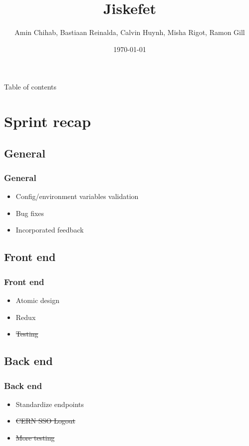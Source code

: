 \documentclass[12pt]{beamer}
\title{Jiskefet}
\author{Amin Chihab, Bastiaan Reinalda, Calvin Huynh, Misha Rigot, Ramon Gill}
\date{\today}
\begin{document}
	\begin{frame}
	\titlepage
	\end{frame}

	\begin{frame}{Table of contents}
		\tableofcontents
    \end{frame}

    \section{Sprint recap}
    \subsection{General}
    \begin{frame}
        \frametitle{General}
        \begin{itemize}
            \item Config/environment variables validation
            \item Bug fixes
            \item Incorporated feedback
        \end{itemize}
    \end{frame}

    \subsection{Front end}
	\begin{frame}
		\frametitle{Front end}
		\begin{itemize}
			\item Atomic design
			\item Redux
			\item \sout{Testing}                                       
		\end{itemize}
	\end{frame}

    \subsection{Back end}
	\begin{frame}
		\frametitle{Back end}
		\begin{itemize}
			\item Standardize endpoints
			\item \sout{CERN SSO Logout}
			\item \sout{More testing}
		\end{itemize}
	\end{frame}
\end{document}
